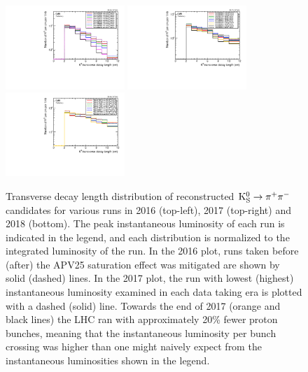 \begin{figure}[hbtp]
\centering
\includegraphics[width=0.4\textwidth]{figures/tracking_eff/2016/k0.pdf}
\includegraphics[width=0.4\textwidth]{figures/tracking_eff/2017/k0.pdf}
\includegraphics[width=0.4\textwidth]{figures/tracking_eff/2018/k0.pdf}
\caption{Transverse decay length distribution of reconstructed $\mathrm{K^0_S}\to\pi^+\pi^-$ candidates for various runs in 2016 (top-left), 2017 (top-right) and 2018 (bottom). The peak instantaneous luminosity of each run is indicated in the legend, and each distribution is normalized to the integrated luminosity of the run. In the 2016 plot, runs taken before (after) the APV25 saturation effect was mitigated are shown by solid (dashed) lines. In the 2017 plot, the run with lowest (highest) instantaneous luminosity examined in each data taking era is plotted with a dashed (solid) line. Towards the end of 2017 (orange and black lines) the LHC ran with approximately 20\% fewer proton bunches, meaning that the instantaneous luminosity per bunch crossing was higher than one might naively expect from the instantaneous luminosities shown in the legend.}
\label{k0_tracking_eff}
\end{figure}